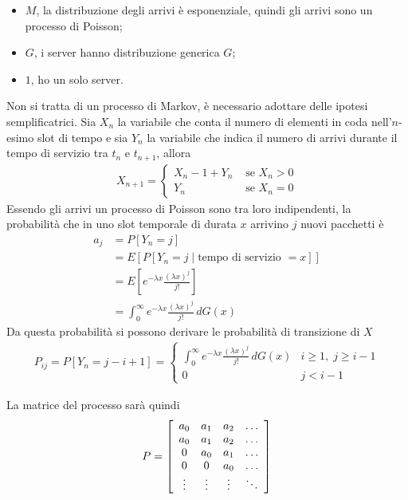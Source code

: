 \documentclass{article}
\begin{document}
\begin{itemize}
    \item $M$, la distribuzione degli arrivi è esponenziale, quindi gli arrivi sono un processo di Poisson;
    \item $G$, i server hanno distribuzione generica $G$;
    \item $1$, ho un solo server.
\end{itemize}
Non si tratta di un processo di Markov, è necessario adottare delle ipotesi semplificatrici. Sia $X_n$ la variabile che conta il numero di elementi in coda nell'$n$-esimo slot di tempo e sia $Y_n$ la variabile che indica il numero di arrivi durante il tempo di servizio tra $t_n$ e $t_{n+1}$, allora
\begin{align*}
X_{n+1} = \begin{cases}
X_n - 1 + Y_n & \text{ se } X_n > 0\\
Y_n & \text{ se } X_n = 0
\end{cases}
\end{align*}
Essendo gli arrivi un processo di Poisson sono tra loro indipendenti, la probabilità che in uno slot temporale di durata $x$ arrivino $j$ nuovi pacchetti è
\begin{align*}
a_j &= P[Y_n = j]\\
&= E[P[Y_n = j \mid \text{tempo di servizio } = x]]\\
&= E[e^{-\lambda x}\frac{(\lambda x)^j}{j!}]\\
&= \int_0^{\infty}e^{-\lambda x} \frac{(\lambda x)^j}{j!}\,dG(x)
\end{align*}
Da questa probabilità si possono derivare le probabilità di transizione di $X$
\begin{align*}
P_{ij} = P[Y_n = j -i + 1] = \begin{cases}
\int_0^{\infty} e^{-\lambda x} \frac{(\lambda x)^j}{j!}\, dG(x) & i \ge 1,\;j \ge i-1\\
0 & j < i -1
\end{cases}
\end{align*}

La matrice del processo sarà quindi
\begin{align*}
P = \left[\begin{array}{c c c c}
a_0 & a_1 & a_2 & \hdots \\
a_0 & a_1 & a_2 & \hdots \\
0 & a_0 & a_1 & \hdots \\
0 & 0 & a_0 & \hdots \\
\vdots & \vdots & \vdots & \ddots
\end{array}\right]
\end{align*}
\end{document}
